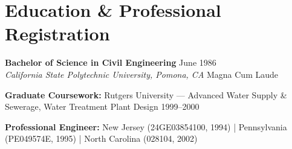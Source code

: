 \documentclass[10pt, letterpaper]{article}
\begin{document}
\section{Education \& Professional Registration}

\textbf{Bachelor of Science in Civil Engineering} \hfill June 1986 \\
\textit{California State Polytechnic University, Pomona, CA} \hfill Magna Cum Laude

\textbf{Graduate Coursework:} Rutgers University --- Advanced Water Supply \& Sewerage, Water Treatment Plant Design \hfill 1999--2000

\vspace{2pt}

\textbf{Professional Engineer:} New Jersey (24GE03854100, 1994) | Pennsylvania (PE049574E, 1995) | North Carolina (028104, 2002)
\end{document}

